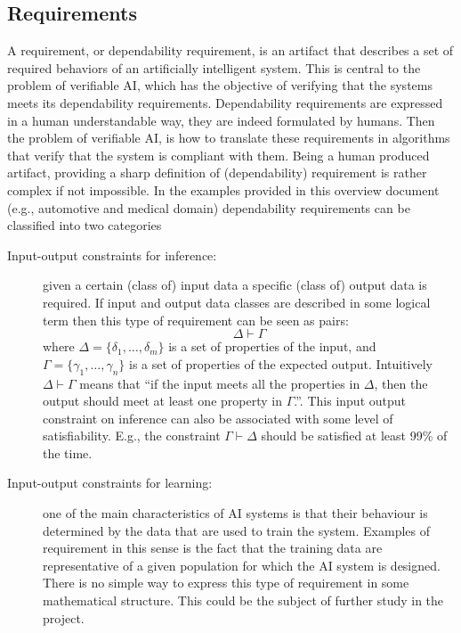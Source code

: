 \subsection{Requirements}
A requirement, or dependability requirement, is an artifact that
describes a set of required behaviors of an artificially intelligent
system. This is central to the problem of verifiable AI, which has the
objective of verifying that the systems meets its dependability
requirements. 
Dependability requirements are expressed in a human understandable
way, they are indeed formulated by humans. Then the problem of
verifiable AI, is how to translate these requirements in algorithms
that verify that the system is compliant with them. 
Being a human produced artifact, providing a sharp definition of
(dependability) requirement is rather complex if not impossible. In
the examples provided in this overview document (e.g., automotive and
medical domain) dependability requirements can be classified into two
categories 
\begin{description}
\item[Input-output constraints for inference:] given a certain (class of) input data
  a specific (class of) output data is required. If input and output
  data classes are described in some logical term then this type of
  requirement can be seen as pairs: 
$$
\Delta\vdash\Gamma 
$$
where $\Delta=\{\delta_1,\dots,\delta_m\}$ is a set of properties of
the input, and $\Gamma=\{\gamma_1,\dots,\gamma_n\}$ is a set of
properties of the expected output. Intuitively $ \Delta\vdash\Gamma $
means that ``if the input meets all the properties in $\Delta$, then
the output should meet at least one property in $\Gamma$.''.  This
input output constraint on inference can also be associated with some
level of satisfiability. E.g., the constraint $\Gamma\vdash\Delta$
should be satisfied at least 99\% of the time.

\item[Input-output constraints for learning:] one of the main
  characteristics of AI systems is that their behaviour is determined
  by the data that are used to train the system. Examples of
  requirement in this sense is the fact that the training data are
  representative of a given population for which the AI system is
  designed. There is no simple way to express this type of requirement
  in some mathematical structure. This could be the subject of further
  study in the project. 
\end{description}


